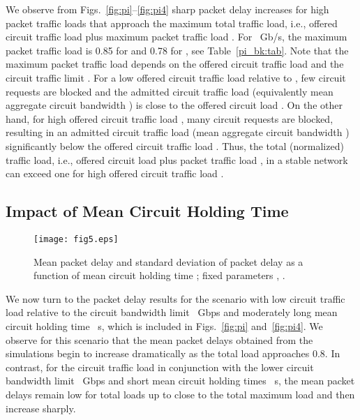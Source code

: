 \documentclass[article]{IEEEtran}
\begin{document}
We observe from Figs.~\ref{fig:pi}--\ref{fig:pi4}
sharp packet delay increases for
high packet traffic loads  that approach the maximum total
traffic load, i.e., offered circuit traffic load  plus maximum
packet traffic load .
For ~Gb/s, the maximum packet traffic load
 is 0.85 for  and 0.78 for , see
Table~\ref{pi_bk:tab}. Note that the maximum packet traffic load
 depends on the offered circuit traffic load  and
the circuit traffic limit . For a low offered circuit traffic
load  relative to , few circuit requests are blocked
and the admitted circuit traffic load (equivalently mean aggregate
circuit bandwidth ) is close to the offered circuit
load . On the other hand, for high offered circuit traffic
load , many circuit requests are blocked, resulting in an
admitted circuit traffic load (mean aggregate circuit bandwidth
) significantly below the offered circuit traffic load
. Thus, the total (normalized) traffic load, i.e., offered
circuit load  plus packet traffic load ,
in a stable network can exceed one for
high offered circuit traffic load .


\subsection{Impact of Mean Circuit Holding Time}
\label{mu_impact:sec}
\begin{figure}[t]
\texttt{[image: fig5.eps]}
\caption{Mean packet delay  and standard deviation of
packet delay as a function of mean circuit
holding time ; fixed parameters
, .}
\label{fig:mu}
\end{figure}
We now turn to the packet delay results for the
scenario with low circuit traffic load  relative to the
circuit bandwidth limit ~Gbps and moderately long
mean circuit holding time ~s,
which is included in Figs.~\ref{fig:pi} and~\ref{fig:pi4}.
We observe for this scenario that the mean packet delays
obtained from the simulations begin to increase dramatically
as the total load  approaches 0.8.
In contrast, for the circuit traffic load 
in conjunction with the lower circuit bandwidth limit ~Gbps
and short mean circuit holding times ~s,
the mean packet delays remain low for total loads up to
close to the total maximum load 
and then increase sharply.
\end{document}
